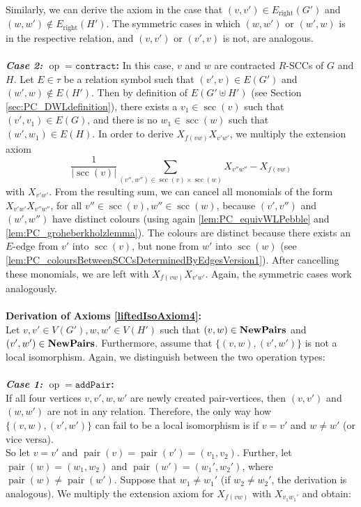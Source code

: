 \documentclass[a4paper,UKenglish,cleveref, autoref, thm-restate]{lipics-v2021}
\newcommand{\Pairs}{\text{\upshape \textbf{NewPairs}}}
\newcommand{\pairOp }{\texttt{addPair}}
\newcommand{\sccOp }{\texttt{contract}}
\newcommand{\op}{\operatorname{op}}
\newcommand{\scc}{{\operatorname{scc}}}
\newcommand{\pair}{{\operatorname{pair}}}
\begin{document}
Similarly, we can derive the axiom in the case that $(v,v') \in  E_{\text{right}}(G')$ and $(w,w') \notin E_{\text{right}}(H')$. The symmetric cases in which $(w,w')$ or $(w',w)$ is in the respective relation, and $(v,v')$ or $(v',v)$ is not, are analogous.\\ 
\\
\textbf{\textit{Case 2:} $\op = \sccOp$:}
In this case, $v$ and $w$ are contracted $R$-SCCs of $G$ and $H$. Let $E \in \tau$ be a relation symbol such that $(v',v) \in E(G')$ and  $(w',w) \notin E(H')$. Then by definition of $E(G' \uplus H')$ (see Section \ref{sec:PC_DWLdefinition}), there exists a $v_1 \in \scc(v)$ such that $(v',v_1) \in E(G)$, and there is no $w_1 \in \scc(w)$ such that $(w',w_1) \in E(H)$.
In order to derive $X_{f(vw)}X_{v'w'}$, we multiply the extension axiom
\[
\frac{1}{|\scc(v)|}\sum\limits_{(v'',w'')\in \scc(v) \times \scc(w)} X_{v'' w''} - X_{f(vw)}
\]
with $X_{v'w'}$. From the resulting sum, we can cancel all monomials of the form $X_{v'w'}X_{v''w''}$, for all $v'' \in \scc(v), w'' \in \scc(w)$, because $(v', v'')$ and $(w',w'')$ have distinct colours (using again \autoref{lem:PC_equivWLPebble} and \autoref{lem:PC_groheberkholzlemma}). The colours are distinct because there exists an $E$-edge from $v'$ into $\scc(v)$, but none from $w'$ into $\scc(w)$ (see \autoref{lem:PC_coloursBetweenSCCsDeterminedByEdgesVersion1}). After cancelling these monomials, we are left with $X_{f(vw)}X_{v'w'}$.
Again, the symmetric cases work analogously.\\
\\
\textbf{Derivation of Axioms \eqref{liftedIsoAxiom4}:}\\ 
Let $v,v' \in V(G'), w,w' \in V(H')$ such that $(v,w) \in \Pairs$ and  $(v',w') \in \Pairs$. Furthermore, assume that $\{(v,w),(v',w')\}$ is not a local isomorphism. Again, we distinguish between the two operation types:\\
\\
\textbf{\textit{Case 1:} $\op = \pairOp $:}\\
If all four vertices $v,v',w,w'$ are newly created pair-vertices, then $(v,v')$ and $(w,w')$ are not in any relation. Therefore, the only way how $\{(v,w),(v',w')\}$ can fail to be a local isomorphism is if $v = v'$ and $w \neq w'$ (or vice versa).\\
So let $v = v'$ and $\pair(v) = \pair(v') = (v_1,v_2)$. Further, let $\pair(w) = (w_1,w_2)$ and $\pair(w') = (w_1',w_2')$, where $\pair(w) \neq \pair(w')$. Suppose that $w_1 \neq w_1'$ (if $w_2 \neq w_2'$, the derivation is analogous). We multiply the extension axiom for $X_{f(vw)}$ with $X_{v_1w_1'}$ and obtain:
\end{document}
